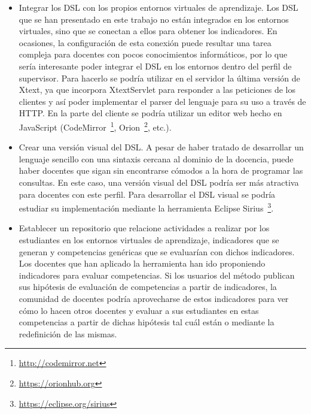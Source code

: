 \begin{itemize}
\item Integrar los DSL con los propios entornos virtuales de aprendizaje. Los DSL que se han presentado en este trabajo no están integrados en los entornos virtuales, sino que se conectan a ellos para obtener los indicadores. En ocasiones, la configuración de esta conexión puede resultar una tarea compleja para docentes con pocos conocimientos informáticos, por lo que sería interesante poder integrar el DSL en los entornos dentro del perfil de supervisor. Para hacerlo se podría utilizar en el servidor la última versión de Xtext, ya que incorpora XtextServlet para responder a las peticiones de los clientes y así poder implementar el parser del lenguaje para su uso a través de HTTP. En la parte del cliente se podría utilizar un editor web hecho en JavaScript (CodeMirror~\footnote{\url{http://codemirror.net}}, Orion~\footnote{\url{https://orionhub.org}}, etc.).
\item Crear una versión visual del DSL. A pesar de haber tratado de desarrollar un lenguaje sencillo con una sintaxis cercana al dominio de la docencia, puede haber docentes que sigan sin encontrarse cómodos a la hora de programar las consultas. En este caso, una versión visual del DSL podría ser más atractiva para docentes con este perfil. Para desarrollar el DSL visual se podría estudiar su implementación mediante la herramienta Eclipse Sirius~\footnote{\url{https://eclipse.org/sirius}}.
\item Establecer un repositorio que relacione actividades a realizar por los estudiantes en los entornos virtuales de aprendizaje, indicadores que se generan y competencias genéricas que se evaluarían con dichos indicadores. Los docentes que han aplicado la herramienta han ido proponiendo indicadores para evaluar competencias. Si los usuarios del método publican sus hipótesis de evaluación de competencias a partir de indicadores, la comunidad de docentes podría aprovecharse de estos indicadores para ver cómo lo hacen otros docentes y evaluar a sus estudiantes en estas competencias a partir de dichas hipótesis tal cuál están o mediante la redefinición de las mismas.
\end{itemize}


